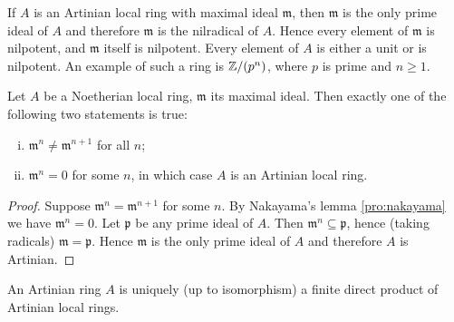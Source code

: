 If $A$ is an Artinian local ring with maximal ideal $\mathfrak{m}$, then $\mathfrak{m}$ is the only prime ideal of $A$ and therefore $\mathfrak{m}$ is the nilradical of $A$. Hence every element of $\mathfrak{m}$ is nilpotent, and $\mathfrak{m}$ itself is nilpotent. Every element of $A$ is either a unit or is nilpotent. An example of such a ring is $\mathbb{Z}/(p^n)$, where $p$ is prime and $n \geq 1$.

\begin{proposition}\label{prop:noetherian-local-dichotomy}
Let $A$ be a Noetherian local ring, $\mathfrak{m}$ its maximal ideal. Then exactly one of the following two statements is true:
\begin{enumerate}[i)]
    \item $\mathfrak{m}^n \neq \mathfrak{m}^{n+1}$ for all $n$;
    \item $\mathfrak{m}^n = 0$ for some $n$, in which case $A$ is an Artinian local ring.
\end{enumerate}
\end{proposition}

\begin{proof}
Suppose $\mathfrak{m}^n = \mathfrak{m}^{n+1}$ for some $n$. By Nakayama's lemma \eqref{pro:nakayama} we have $\mathfrak{m}^n = 0$. Let $\mathfrak{p}$ be any prime ideal of $A$. Then $\mathfrak{m}^n \subseteq \mathfrak{p}$, hence (taking radicals) $\mathfrak{m} = \mathfrak{p}$. Hence $\mathfrak{m}$ is the only prime ideal of $A$ and therefore $A$ is Artinian.
\end{proof}

\begin{theorem}\label{thm:artin-structure}
An Artinian ring $A$ is uniquely (up to isomorphism) a finite direct product of Artinian local rings.
\end{theorem}

